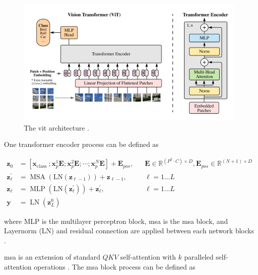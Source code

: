 \documentclass[11pt,times,oneside,openright]{eeereport}
\begin{document}
\begin{figure}[h]
    \centering
    \includegraphics[width=\textwidth]{fig/methodology/vision_transformer.png}
    \caption{The \acrlong{vit} architecture \cite{dosovitskiy2020image}.}
    \label{fig:vision_transformer}
\end{figure}

One transformer encoder process can be defined as

\begin{equation}
    \begin{aligned}
\mathbf{z}_{0} & =\left[\mathbf{x}_{\text {class }} ; \mathbf{x}_{p}^{1} \mathbf{E} ; \mathbf{x}_{p}^{2} \mathbf{E} ; \cdots ; \mathbf{x}_{p}^{N} \mathbf{E}\right]+\mathbf{E}_{p o s}, & & \mathbf{E} \in \mathbb{R}^{\left(P^{2} \cdot C\right) \times D}, \mathbf{E}_{p o s} \in \mathbb{R}^{(N+1) \times D} \\
\mathbf{z}_{\ell}^{\prime} & =\operatorname{MSA}\left(\mathrm{LN}\left(\mathbf{z}_{\ell-1}\right)\right)+\mathbf{z}_{\ell-1}, & & \ell=1 \ldots L \\
\mathbf{z}_{\ell} & =\operatorname{MLP}\left(\mathrm{LN}\left(\mathbf{z}_{\ell}^{\prime}\right)\right)+\mathbf{z}_{\ell}^{\prime}, & & \ell=1 \ldots L \\
\mathbf{y} & =\operatorname{LN}\left(\mathbf{z}_{L}^{0}\right) & &
\end{aligned}
\end{equation}

where MLP is the multilayer perceptron block, \acrshort{msa} is the \acrlong{msa} block, and Layernorm (LN) and residual connection are applied between each network blocks \cite{dosovitskiy2020image}.

\acrfull{msa} is an extension of standard $QKV$ self-attention with $k$ paralleled self-attention operations \cite{dosovitskiy2020image}. The \acrshort{msa} block process can be defined as
\end{document}
